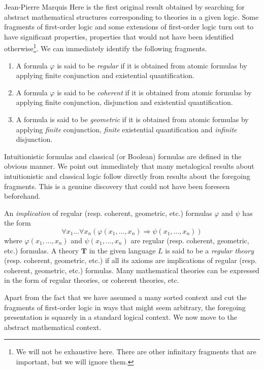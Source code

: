 \begin{artengenv}{Jean-Pierre Marquis}
Here is the first original result obtained by searching for abstract mathematical structures corresponding to theories in a given logic. Some fragments of first-order logic and some extensions of first-order logic turn out to have significant properties, properties that would not have been identified otherwise\footnote{We will not be exhaustive here. There are other infinitary fragments that are important, but we will ignore them.}. We can immediately identify  the following fragments.
\begin{enumerate}
	\item A formula \( \varphi \) is said to be \textit{regular} if it is obtained from atomic formulas by applying finite conjunction and existential quantification.
 	\item A formula \( \varphi \) is said to be \textit{coherent} if it is obtained from atomic formulas by applying finite conjunction, disjunction and existential quantification. 
	\item A formula is said to be \textit{geometric}  if it is obtained from atomic formulas by applying \textit{finite} conjunction, \textit{finite} existential quantification and \textit{infinite} disjunction. 
\end{enumerate}

Intuitionistic formulas and classical (or Boolean) formulas are defined in the obvious manner. We point out immediately that many metalogical results about intuitionistic and classical logic follow directly from results about the foregoing fragments. This is a genuine discovery that could not have been foreseen beforehand. 

An \textit{implication} of regular (resp. coherent, geometric, etc.) formulas \( \varphi \) and \( \psi \) has the form
%
\[
\forall x_1 \dots \forall x_n (\varphi(x_1, \dots, x_n) \Rightarrow \psi(x_1, \dots, x_n))
\]
%
where \( \varphi(x_1, \dots, x_n) \) and \( \psi(x_1, \dots, x_n) \) are regular (resp. coherent, geometric, etc.) formulas. A theory \( \mathbf{T} \) in the given language \( L \) is said to be a \textit{regular theory} (resp. coherent, geometric, etc.) if all its axioms are implications of regular (resp. coherent, geometric, etc.) formulas. Many mathematical theories can be expressed in the form of regular theories, or coherent theories, etc. 


Apart from the fact that we have assumed a many sorted context and cut the fragments of first-order logic in ways that might seem arbitrary, the foregoing presentation is squarely in a standard logical context. We now move to the abstract mathematical context.


\end{artengenv}
